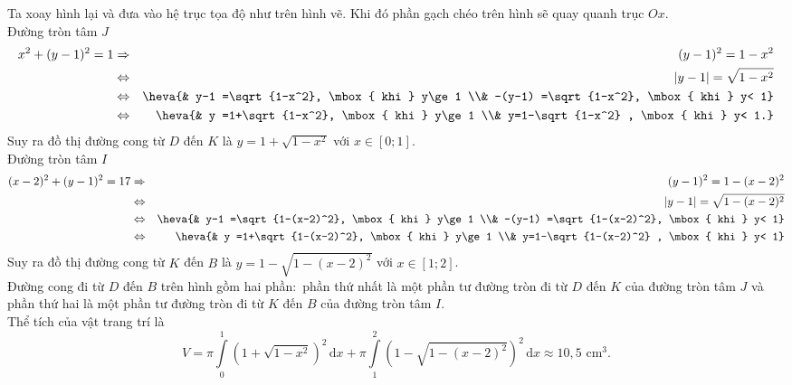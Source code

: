 \begin{ex}
{\begin{center}
\end{center}
Ta xoay hình lại và đưa vào hệ trục tọa độ như trên hình vẽ. Khi đó phần gạch chéo trên hình sẽ quay quanh trục $Ox$.\\
Đường tròn tâm $J$
\allowdisplaybreaks
\begin{eqnarray*}
x^2+(y-1)^2=1&\Rightarrow& (y-1)^2=1-x^2\\
& \Leftrightarrow& |y-1|=\sqrt{1-x^2}\\
& \Leftrightarrow &\heva{& y-1 =\sqrt{1-x^2}, \mbox{ khi } y\ge 1 \\& -(y-1) =\sqrt{1-x^2}, \mbox{ khi } y< 1} \\
&\Leftrightarrow& \heva{& y =1+\sqrt{1-x^2}, \mbox{ khi } y\ge 1 \\& y=1-\sqrt{1-x^2} , \mbox{ khi } y< 1.}
\end{eqnarray*}
Suy ra đồ thị đường cong từ $D$ đến $K$ là $y=1+\sqrt{1-x^2}$ với $x\in [0;1]$.\\
Đường tròn tâm $I$
\begin{eqnarray*}
(x-2)^2+(y-1)^2=17&\Rightarrow& (y-1)^2=1-(x-2)^2 \\
&\Leftrightarrow& |y-1|=\sqrt{1-(x-2)^2}\\
&\Leftrightarrow& \heva{& y-1 =\sqrt{1-(x-2)^2}, \mbox{ khi } y\ge 1 \\& -(y-1) =\sqrt{1-(x-2)^2}, \mbox{ khi } y< 1}\\
&\Leftrightarrow& \heva{& y =1+\sqrt{1-(x-2)^2}, \mbox{ khi } y\ge 1 \\& y=1-\sqrt{1-(x-2)^2} , \mbox{ khi } y< 1}
\end{eqnarray*}
Suy ra đồ thị đường cong từ $K$ đến $B$ là $y=1-\sqrt{1-(x-2)^2}$ với $x\in [1;2]$.\\
Đường cong đi từ $D$ đến $B$ trên hình gồm hai phần$\colon$ phần thứ nhất là một phần tư đường tròn đi từ $D$ đến $K$ của đường tròn tâm $J$ và phần thứ hai là một phần tư đường tròn đi từ $K$ đến $B$ của đường tròn tâm $I$.\\
Thể tích của vật trang trí là
\[V= \pi\displaystyle\int\limits_0^1 \left(1+\sqrt{1-x^2}\right)^2\mathrm{\,d}x +  \pi\displaystyle\int\limits_1^2 \left(1-\sqrt{1-(x-2)^2}\right)^2\mathrm{\,d}x \approx 10{,}5 \mbox{ cm}^3.\]
}
\end{ex}


